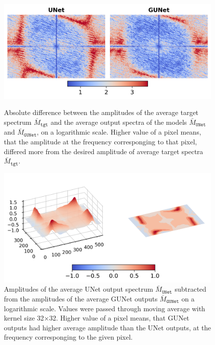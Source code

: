\begin{figure}[ht]
    \centering
    \begin{subcaptionblock}[t]{\textwidth}
        \centering
        \includegraphics[width=\textwidth]{images/fourier_diff_2.png}
        \caption[Delta of the target and output spectra without smoothing]{\label{fig:fourier_diff_2}Absolute difference between the amplitudes of the average target spectrum $\bar{M}_{\texttt{tgt}}$ and the average output spectra of the models $\bar{M}_{\texttt{UNet}}$ and $\bar{M}_{\texttt{GUNet}}$, on a logarithmic scale. Higher value of a pixel means, that the amplitude at the frequency corresponging to that pixel, differed more from the desired amplitude of average target spectra $\bar{M}_{\texttt{tgt}}$. }
    \end{subcaptionblock}
    \begin{subcaptionblock}[t]{\textwidth}
        \centering
        \includegraphics[width=\textwidth]{images/fourier_diff_3.png}
        \caption[Difference in the output spectra of both models]{\label{fig:fourier_diff_3}Amplitudes of the average UNet output spectrum $\bar{M}_{\texttt{UNet}}$ subtracted from the amplitudes of the average GUNet outputs $\bar{M}_{\texttt{GUNet}}$ on a logarithmic scale. Values were passed through moving average with kernel size 32×32. Higher value of a pixel means, that GUNet outputs had higher average amplitude than the UNet outputs, at the frequency corresponging to the given pixel.}
    \end{subcaptionblock}
\end{figure}


